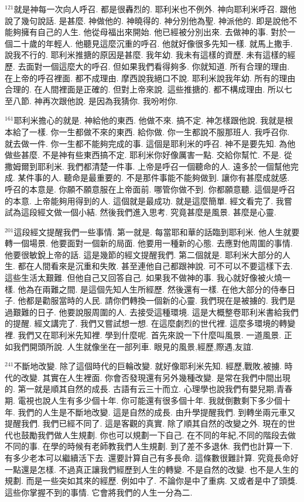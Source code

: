 \documentclass{book}
\begin{document}
$^{121}$就是神每一次向人呼召.
都是很轟烈的.
耶利米也不例外.
神向耶利米呼召.
跟他說了幾句說話.
是甚麼.
神做他的.
神曉得的.
神分別他為聖.
神派他的.
即是說他不能夠擁有自己的人生.
他從母福出來開始.
他已經被分別出來.
去做神的事.
對於一個二十歲的年輕人.
他聽見這麼沉重的呼召.
他就好像很多先知一樣.
就馬上撒手.
說我不行的.
耶利米推搪的原因是甚麼.
我年幼.
我未有這樣的資歷.
未有這樣的經歷.
去面對一個這麼大的呼召.
但如果我們看得夠多.
你就知道.
所有合理的理由.
在上帝的呼召裡面.
都不成理由.
摩西說我絕口不說.
耶利米說我年幼.
所有的理由合理的.
在人間裡面是正確的.
但對上帝來說.
這些推搪的.
都不構成理由.
所以七至八節.
神再次跟他說.
是因為我猜你.
我吩咐你.

$^{161}$耶利米擔心的就是.
神給他的東西.
他做不來.
搞不定.
神怎樣跟他說.
我就是根本給了一樣.
你一生都做不來的東西.
給你做.
你一生都說不服那班人.
我呼召你.
就去做一件.
你一生都不能夠完成的事.
這個是耶利米的呼召.
神不是要先知.
為他做些甚麼.
不是神有些東西搞不定.
耶利米你好像厲害一點.
交給你幫忙.
不是.
從撒姆爾到耶利米.
我們都清楚一件事.
上帝是呼召一個聽命的人.
遠多於一個幫他完成.
某件事的人.
聽命是最重要的.
不是那件事能不能夠做到.
讓你有甚麼成就感.
呼召的本意是.
你願不願意服在上帝面前.
哪管你做不到.
你都願意聽.
這個是呼召的本意.
上帝能夠用得到的人.
這個就是最成功.
就是這麼簡單.
經文看完了.
我嘗試為這段經文做一個小結.
然後我們進入思考.
究竟甚麼是風景.
甚麼是心靈.

$^{201}$這段經文提醒我們一些事情.
第一就是.
每當耶和華的話臨到耶利米.
他人生就要轉一個場景.
他要面對一個新的局面.
他要用一種新的心態.
去應對他周圍的事情.
他要很敏銳上帝的話.
這是幾節的經文提醒我們.
第二個就是.
耶利米大部分的人生.
都在人間看來是沉重和失敗.
甚至連他自己都跟神說.
可不可以不要這樣下去.
這些生活太艱難.
但他自己又回答自己.
如果我不做神的事.
我心就好像被火燒一樣.
他為在兩難之間.
是這個先知人生所經歷.
然後還有一樣.
在他大部分的侍奉日子.
他都是勸服當時的人民.
請你們轉換一個新的心靈.
我們現在是被擄的.
我們是過艱難的日子.
他要說服周圍的人.
去接受這種環境.
這是大概整卷耶利米書給我們的提醒.
經文講完了.
我們又嘗試想一想.
在這麼劇烈的世代裡.
這麼多環境的轉變裡.
我們又在耶利米先知裡.
學到什麼呢.
首先來說一下什麼叫風景.
一道風景.
正如我們開頭所說.
人生就像坐在一部列車.
眼見的風景,經歷,際遇,友誼.

$^{241}$不斷地改變.
除了這個時代的巨輪改變.
就好像耶利米先知.
經歷,戰敗,被擄.
時代的改變.
其實在人生裡面.
你會否發現還有另外幾種改變.
是常在我們中間出現的.
第一就是順其自然的成長.
古語有云三十而立.
心理學也說我們有嬰兒期,青春期.
電視也說人生有多少個十年.
你可能還有很多個十年.
我就倒數剩下多少個十年.
我們的人生是不斷地改變.
這是自然的成長.
由升學提醒我們.
到轉坐兩元車又提醒我們.
我們已經不同了.
這是客觀的真實.
除了順其自然的改變之外.
現在的世代也鼓勵我們做人生規劃.
你也可以規劃一下自己.
在不同的年紀,不同的階段去做不同的事.
在學的時候有老師教我們人生規劃.
到了差不多退休.
我們也計算一下.
有多少老本可以繼續活下去.
還要計算自己有多長命.
這條數很難計算.
究竟長命好一點還是怎樣.
不過真正讓我們經歷到人生的轉變.
不是自然的改變.
也不是人生的規劃.
而是一些突如其來的經歷.
例如中了.
不論你是中了重病.
又或者是中了頭獎.
這些你掌握不到的事情.
它會將我們的人生一分為二.
\end{document}
